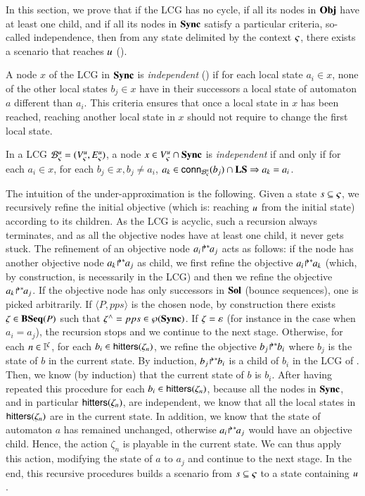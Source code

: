 In this section, we prove that if the LCG has no cycle, if all its nodes in $\mathbf{Obj}$ have at least one
child, and if all its nodes in $\mathbf{Sync}$ satisfy a
particular criteria, so-called independence, then from any state
delimited by the context $\varsigma$, there exists a scenario that reaches $u$
().

A node $x$ of the LCG in $\mathbf{Sync}$ is \emph{independent} () if for each local state
$a_i\in x$, none of the other local states $b_j\in x$ have in their successors a local state of automaton $a$ different
than $a_i$.
This criteria ensures that once a local state in $x$ has been reached, reaching another local state
in $x$ should not require to change the first local state.

\begin{definition}
\label{def:coherent}
  In a LCG ${\mathcal{B}_{\varsigma}^{u}} = ({V_\varsigma^u}, {E_\varsigma^u})$,
  a node $x \in {V_\varsigma^u}\cap\mathbf{Sync}$ is \emph{independent} if and only if
  for each $a_i\in x$,
  for each $b_j\in x, b_j\neq a_i$,
  $a_k \in\mathsf{conn}_{{\mathcal{B}_{\varsigma}^{u}}}(b_j) \cap \mathbf{LS} \Rightarrow a_k = a_i$.
\end{definition}

The intuition of the under-approximation is the following.
Given a state $s\subseteq\varsigma$, we recursively refine the initial objective
(which is: reaching $u$ from the initial state) according to its children.
As the LCG is acyclic, such a recursion always terminates, and as all the objective nodes have at
least one child, it never gets stuck.
The refinement of an objective node ${a_i\!\Rsh^*\!\!a_j}$ acts as follows:
if the node has another objective node ${a_k\!\Rsh^*\!\!a_j}$ as child, we first refine the objective
${a_i\!\Rsh^*\!\!a_k}$ (which, by construction, is necessarily in the LCG)
and then we refine the objective ${a_k\!\Rsh^*\!\!a_j}$.
If the objective node has only successors in $\mathbf{Sol}$ (bounce sequences), one is picked arbitrarily.
If $\langle P, pps\rangle$ is the chosen node,
by construction there exists $\zeta\in\mathbf{BSeq}(P)$ such that $\zeta^\wedge = pps \in \wp(\mathbf{Sync})$.
If $\zeta = \varepsilon$ (for instance in the case when $a_i = a_j$), the recursion stops and we
continue to the next stage.
Otherwise, for each $n\in\mathbb{I}^{\zeta}$,
for each $b_i \in\mathsf{hitters}(\zeta_n)$,
we refine the objective ${b_j\!\Rsh^*\!\!b_i}$ where $b_j$ is the state of $b$ in the current state.
By induction, ${b_j\!\Rsh^*\!\!b_i}$ is a child of $b_i$ in the LCG of .
Then, we know (by induction) that the current state of $b$ is $b_i$.
After having repeated this procedure for each $b_i\in\mathsf{hitters}(\zeta_n)$,
because all the nodes in $\mathbf{Sync}$, and in particular $\mathsf{hitters}(\zeta_n)$, are independent,
we know that all the local states in $\mathsf{hitters}(\zeta_n)$ are in the current state.
In addition, we know that the state of automaton $a$ has remained unchanged, otherwise
${a_i\!\Rsh^*\!\!a_j}$ would have an objective child.
Hence, the action $\zeta_n$ is playable in the current state.
We can thus apply this action, modifying the state of $a$ to $a_j$ and continue to the next stage.
In the end, this recursive procedures builds a scenario from $s\subseteq\varsigma$ to a state containing $u$.


